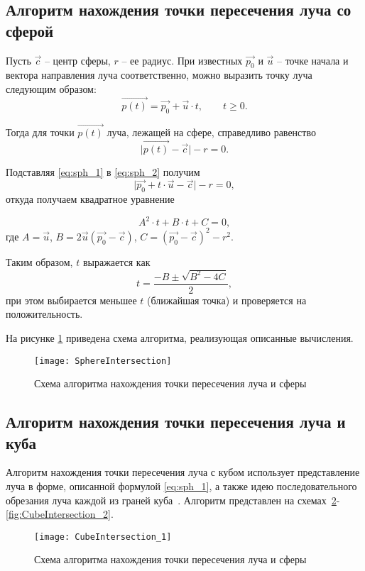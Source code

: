 \subsection{Алгоритм нахождения точки пересечения луча со сферой}
Пусть $\vec{c}$ -- центр сферы, $r$ -- ее радиус. При известных $\vec{p_0}$ и $\vec{u}$ -- точке начала и вектора направления луча соответственно, можно выразить точку луча следующим образом:
\begin{equation}\label{eq:sph_1}
	\vec{p(t)} = \vec{p_0} + \vec{u} \cdot t, \qquad t \ge 0.
\end{equation}

Тогда для точки $\vec{p(t)}$ луча, лежащей на сфере, справедливо равенство
\begin{equation}\label{eq:sph_2}
	\lvert\vec{p(t)}-\vec{c}\rvert - r = 0.
\end{equation}

Подставляя \ref{eq:sph_1} в \ref{eq:sph_2} получим
\begin{equation}
	\lvert\vec{p_0} + t\cdot\vec{u} - \vec{c}\rvert - r = 0,
\end{equation} откуда получаем квадратное уравнение

\begin{equation}
	A^2\cdot t + B\cdot t + C = 0,
\end{equation}
где $A = \vec{u}$, $B = 2\vec{u}(\vec{p_0} - \vec{c})$, $C = (\vec{p_0} - \vec{c})^2 - r^2$.

Таким образом, $t$ выражается как 
\begin{equation}
	t = \frac{-B \pm \sqrt{B^2-4C}}{2}, 
\end{equation}
при этом выбирается меньшее $t$ (ближайшая точка) и проверяется на положительность.

На рисунке \ref{fig:RaySphere} приведена схема алгоритма, реализующая описанные вычисления.

\begin{figure}[H]
	\centering
	\texttt{[image: SphereIntersection]}
	\caption{Схема алгоритма нахождения точки пересечения луча и сферы}
	\label{fig:RaySphere}
\end{figure}

\subsection{Алгоритм нахождения точки пересечения луча и куба}
Алгоритм нахождения точки пересечения луча с кубом использует представление луча в форме, описанной формулой \ref{eq:sph_1}, а также идею последовательного обрезания луча каждой из граней куба~\cite{lit7}.
Алгоритм представлен на схемах~\ref{fig:CubeIntersection_1}-\ref{fig:CubeIntersection_2}.
\begin{figure}[H]
	\centering
	\texttt{[image: CubeIntersection\_1]}
	\caption{Схема алгоритма нахождения точки пересечения луча и сферы}
	\label{fig:CubeIntersection_1}
\end{figure}

